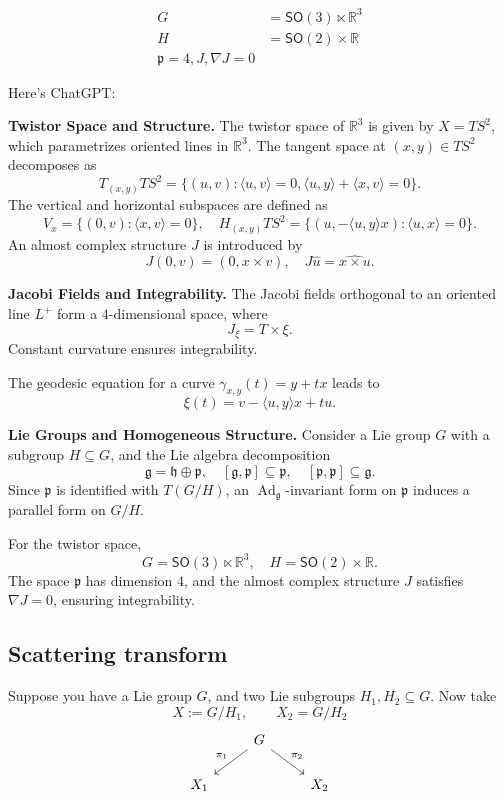  \begin{align*}
G&=\mathsf{SO}(3)\ltimes \mathbb{R}^3\\
H&=\mathsf{SO}(2) \times \mathbb{R}\\
\mathfrak{p}=4, J, \nabla J=0
\end{align*}

Here's ChatGPT:

\textbf{Twistor Space and Structure.} The twistor space of \(\mathbb{R}^3\) is given by \(X = TS^2\), which parametrizes oriented lines in \(\mathbb{R}^3\). The tangent space at \((x,y) \in TS^2\) decomposes as
\[
T_{(x,y)}TS^2 = \{(u,v) : \langle u,v \rangle = 0, \langle u,y \rangle + \langle x,v \rangle = 0 \}.
\]
The vertical and horizontal subspaces are defined as
\[
V_x = \{(0,v) : \langle x,v \rangle = 0\}, \quad H_{(x,y)}TS^2 = \{(u,-\langle u,y \rangle x) : \langle u,x \rangle = 0\}.
\]
An almost complex structure \(J\) is introduced by
\[
J(0,v) = (0, x \times v), \quad J\hat{u} = \widehat{x \times u}.
\]

\textbf{Jacobi Fields and Integrability.} The Jacobi fields orthogonal to an oriented line \(L^+\) form a 4-dimensional space, where
\[
J_{\xi} = T \times \xi.
\]
Constant curvature ensures integrability.

The geodesic equation for a curve \(\gamma_{x,y}(t) = y + tx\) leads to
\[
\xi(t) = v - \langle u,y \rangle x + tu.
\]

\textbf{Lie Groups and Homogeneous Structure.} Consider a Lie group \(G\) with a subgroup \(H \subseteq G\), and the Lie algebra decomposition
\[
\mathfrak{g} = \mathfrak{h} \oplus \mathfrak{p}, \quad [\mathfrak{g},\mathfrak{p}] \subseteq \mathfrak{p}, \quad [\mathfrak{p},\mathfrak{p}] \subseteq \mathfrak{g}.
\]
Since \(\mathfrak{p}\) is identified with \(T(G/H)\), an \(\operatorname{Ad}_{\mathfrak{g}}\)-invariant form on \(\mathfrak{p}\) induces a parallel form on \(G/H\).

For the twistor space,
\[
G = \mathsf{SO}(3) \ltimes \mathbb{R}^3, \quad H = \mathsf{SO}(2) \times \mathbb{R}.
\]
The space \(\mathfrak{p}\) has dimension 4, and the almost complex structure \(J\) satisfies \(\nabla J = 0\), ensuring integrability.


\subsection{Scattering transform}

Suppose you have a Lie group \(G\), and two Lie subgroups \(H_1, H_2 \subseteq G\). Now take
 \[X:=G/H_1,\qquad X_2=G/H_2\]
\[\begin{tikzcd}
&G\arrow[dl,"\pi_1",swap]\arrow[dr,"\pi_2"]\\
X_1&&X_2
\end{tikzcd}\]

